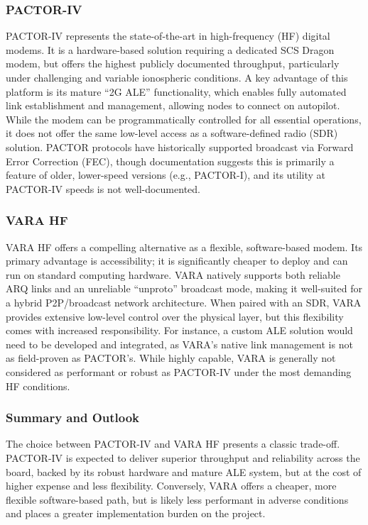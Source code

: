 \documentclass{article}
\begin{document}
\subsubsection{PACTOR-IV}

PACTOR-IV represents the state-of-the-art in high-frequency (HF) digital modems. It is a hardware-based solution requiring a dedicated SCS Dragon modem, but offers the highest publicly documented throughput, particularly under challenging and variable ionospheric conditions. A key advantage of this platform is its mature ``2G ALE'' functionality, which enables fully automated link establishment and management, allowing nodes to connect on autopilot. While the modem can be programmatically controlled for all essential operations, it does not offer the same low-level access as a software-defined radio (SDR) solution. PACTOR protocols have historically supported broadcast via Forward Error Correction (FEC), though documentation suggests this is primarily a feature of older, lower-speed versions (e.g., PACTOR-I), and its utility at PACTOR-IV speeds is not well-documented.

\subsubsection{VARA HF}

VARA HF offers a compelling alternative as a flexible, software-based modem. Its primary advantage is accessibility; it is significantly cheaper to deploy and can run on standard computing hardware. VARA natively supports both reliable ARQ links and an unreliable ``unproto'' broadcast mode, making it well-suited for a hybrid P2P/broadcast network architecture. When paired with an SDR, VARA provides extensive low-level control over the physical layer, but this flexibility comes with increased responsibility. For instance, a custom ALE solution would need to be developed and integrated, as VARA's native link management is not as field-proven as PACTOR's. While highly capable, VARA is generally not considered as performant or robust as PACTOR-IV under the most demanding HF conditions.

\subsubsection{Summary and Outlook}
\label{sec:phys_summary}

The choice between PACTOR-IV and VARA HF presents a classic trade-off. PACTOR-IV is expected to deliver superior throughput and reliability across the board, backed by its robust hardware and mature ALE system, but at the cost of higher expense and less flexibility. Conversely, VARA offers a cheaper, more flexible software-based path, but is likely less performant in adverse conditions and places a greater implementation burden on the project.
\end{document}
